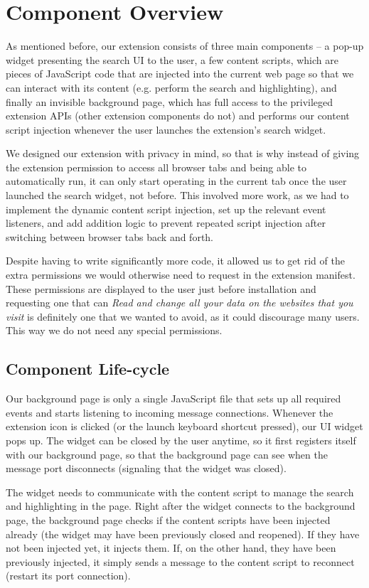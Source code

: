 \documentclass[bsc,frontabs,twoside,singlespacing,parskip,deptreport]{infthesis}
\begin{document}
\section{Component Overview}
As mentioned before, our extension consists of three main components -- a pop-up widget presenting the search UI to the user, a few content scripts, which are pieces of JavaScript code that are injected into the current web page so that we can interact with its content (e.g. perform the search and highlighting), and finally an invisible background page, which has full access to the privileged extension APIs (other extension components do not) and performs our content script injection whenever the user launches the extension's search widget.

We designed our extension with privacy in mind, so that is why instead of giving the extension permission to access all browser tabs and being able to automatically run, it can only start operating in the current tab once the user launched the search widget, not before. This involved more work, as we had to implement the dynamic content script injection, set up the relevant event listeners, and add addition logic to prevent repeated script injection after switching between browser tabs back and forth.

Despite having to write significantly more code, it allowed us to get rid of the extra permissions we would otherwise need to request in the extension manifest. These permissions are displayed to the user just before installation and requesting one that can \textit{Read and change all your data on the websites that you visit} is definitely one that we wanted to avoid, as it could discourage many users. This way we do not need any special permissions.

\subsection{Component Life-cycle}
Our background page is only a single JavaScript file that sets up all required events and starts listening to incoming message connections. Whenever the extension icon is clicked (or the launch keyboard shortcut pressed), our UI widget pops up. The widget can be closed by the user anytime, so it first registers itself with our background page, so that the background page can see when the message port disconnects (signaling that the widget was closed). 

The widget needs to communicate with the content script to manage the search and highlighting in the page. Right after the widget connects to the background page, the background page checks if the content scripts have been injected already (the widget may have been previously closed and reopened). If they have not been injected yet, it injects them. If, on the other hand, they have been previously injected, it simply sends a message to the content script to reconnect (restart its port connection). 
\end{document}
